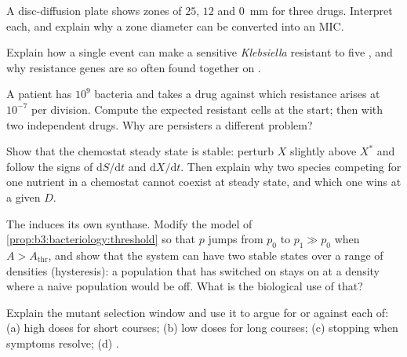 \begin{exercise}[$\star\star$]\label{exo:b3:bacteriology:7}
A disc-diffusion plate shows zones of $25$, $12$ and \qty{0}{mm} for
three drugs. Interpret each, and explain why a zone diameter can be
converted into an MIC.
\end{exercise}

\begin{exercise}[$\star\star$]\label{exo:b3:bacteriology:8}
Explain how a single  event can make a sensitive
\emph{Klebsiella} resistant to five , and why resistance
genes are so often found together on .
\end{exercise}

\begin{exercise}[$\star\star$]\label{exo:b3:bacteriology:9}
A patient has $10^{9}$ bacteria and takes a drug against which
resistance arises at $10^{-7}$ per division. Compute the expected
resistant cells at the start; then with two independent drugs. Why are
persisters a different problem?
\end{exercise}

\begin{exercise}[$\star\star\star$]\label{exo:b3:bacteriology:10}
Show that the chemostat steady state is stable: perturb $X$ slightly
above $X^{*}$ and follow the signs of $\mathrm{d}S/\mathrm{d}t$ and
$\mathrm{d}X/\mathrm{d}t$. Then explain why two species competing for
one nutrient in a chemostat cannot coexist at steady state, and which
one wins at a given $D$.
\end{exercise}

\begin{exercise}[$\star\star\star$]\label{exo:b3:bacteriology:11}
The  induces its own synthase. Modify the model of
\cref{prop:b3:bacteriology:threshold} so that $p$ jumps from $p_{0}$ to
$p_{1} \gg p_{0}$ when $A > A_{\text{thr}}$, and show that the system
can have two stable states over a range of densities (hysteresis):
a population that has switched on stays on at a density where a naive
population would be off. What is the biological use of that?
\end{exercise}

\begin{exercise}[$\star\star\star$]\label{exo:b3:bacteriology:12}
Explain the mutant selection window and use it to argue for or against
each of: (a) high doses for short courses; (b) low doses for long
courses; (c) stopping when symptoms resolve; (d) .
\end{exercise}

